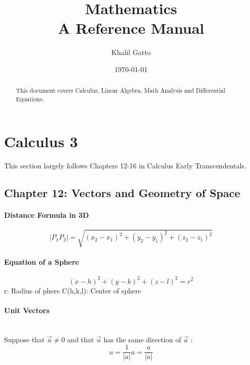 \documentclass{article}
\title{Mathematics\\A Reference Manual}
\author{Khalil Gatto}
\date{\today}
\begin{document}
\maketitle

\begin{abstract}
    This document covers Calculus, Linear Algebra, Math Analysis and Differential Equations.
\end{abstract}

\section*{Calculus 3}
This section largely follows Chapters 12-16 in Calculus Early Transcendentals.

\subsection*{Chapter 12: Vectors and Geometry of Space}

\paragraph{Distance Formula in 3D}
\begin{equation} 
    \label{eq:Distance Formula in 3D}
    |P_1P_2| = \sqrt{(x_2 - x_1)^2 + (y_2 - y_1)^2 + (z_2 - z_1)^2} 
\end{equation}

\paragraph{Equation of a Sphere}
\begin{equation}
    \label{eq:Equation of a Sphere}
    (x - h)^2 + (y-k)^2 + (z-l)^2 = r^2
\end{equation}
r: Radius of phere
\newline
C(h,k,l): Center of sphere

\paragraph{Unit Vectors}\mbox{}\\ %
Suppose that \(\vec{a} \neq 0\) and that \(\vec{u}\) has the same direction of \(\vec{a}\) :
\begin{equation}
    \label{eq:Unit Vector}
    u = \frac{1}{|a|} a = \frac{a}{|a|}
\end{equation}
\end{document}
